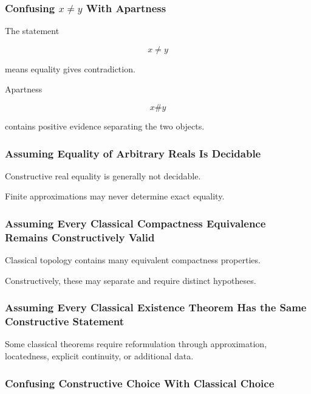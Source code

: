 \subsubsection{Confusing \(x\neq y\) With Apartness}

The statement

\[
x\neq y
\]

means equality gives contradiction.

Apartness

\[
x\# y
\]

contains positive evidence separating the two objects.

\subsubsection{Assuming Equality of Arbitrary Reals Is Decidable}

Constructive real equality is generally not decidable.

Finite approximations may never determine exact equality.

\subsubsection{Assuming Every Classical Compactness Equivalence Remains Constructively Valid}

Classical topology contains many equivalent compactness properties.

Constructively, these may separate and require distinct hypotheses.

\subsubsection{Assuming Every Classical Existence Theorem Has the Same Constructive Statement}

Some classical theorems require reformulation through approximation,
locatedness, explicit continuity, or additional data.

\subsubsection{Confusing Constructive Choice With Classical Choice}

